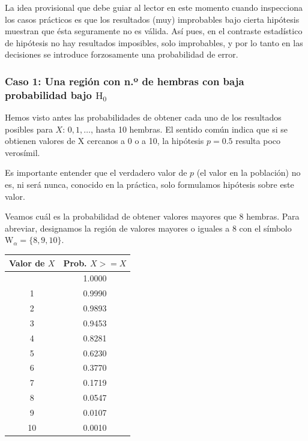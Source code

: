 \documentclass[
]{article}
\begin{document}
La idea provisional que debe guiar al lector en este momento cuando inspecciona los casos prácticos es que los resultados (muy) improbables bajo cierta hipótesis muestran que ésta seguramente no es válida. Así pues, en el contraste estadístico de hipótesis no hay resultados imposibles, solo improbables, y por lo tanto en las decisiones se introduce forzosamente una probabilidad de error.

\subsubsection{\texorpdfstring{Caso 1: Una región con n.º de hembras con baja probabilidad bajo \(\mathrm{H}_{0}\)}{Caso 1: Una región con n.º de hembras con baja probabilidad bajo \textbackslash mathrm\{H\}\_\{0\}}}\label{caso-1-una-regiuxf3n-con-n.uxba-de-hembras-con-baja-probabilidad-bajo-mathrmh_0}

Hemos visto antes las probabilidades de obtener cada uno de los resultados posibles para \(X\): \(0,1, \ldots\), hasta 10 hembras. El sentido común indica que si se obtienen valores de X cercanos a 0 o a 10, la hipótesis \(p=0.5\) resulta poco verosímil.

Es importante entender que el verdadero valor de \(p\) (el valor en la población) no es, ni será nunca, conocido en la práctica, solo formulamos hipótesis sobre este valor.

Veamos cuál es la probabilidad de obtener valores mayores que 8 hembras. Para abreviar, designamos la región de valores mayores o iguales a 8 con el símbolo \(\mathrm{W}_{\alpha}=\{8,9,10\}\).

\begin{longtable}[]{@{}cc@{}}
\toprule\noalign{}
Valor de \(X\) & Prob. \(X>=X\) \\
\midrule\noalign{}
\endhead
\bottomrule\noalign{}
\endlastfoot
0 & 1.0000 \\
1 & 0.9990 \\
2 & 0.9893 \\
3 & 0.9453 \\
4 & 0.8281 \\
5 & 0.6230 \\
6 & 0.3770 \\
7 & 0.1719 \\
8 & 0.0547 \\
9 & 0.0107 \\
10 & 0.0010 \\
\end{longtable}
\end{document}

